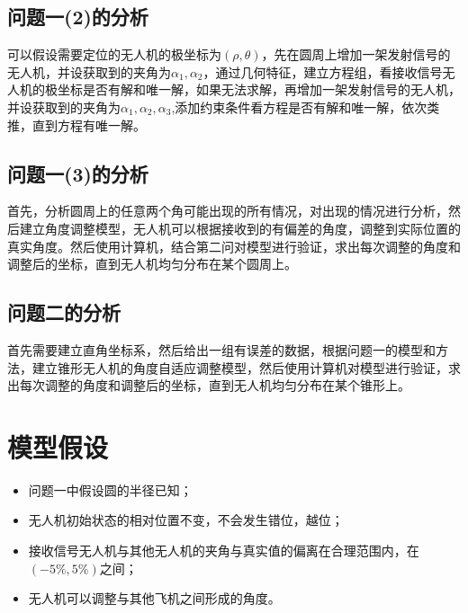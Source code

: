 \documentclass[withoutpreface,bwprint]{cumcmthesis} %
\begin{document}
		\subsection{问题一(2)的分析}
		可以假设需要定位的无人机的极坐标为\textbf{$(\rho,\theta)$}，先在圆周上增加一架发射信号的无人机，并设获取到的夹角为\textbf{$\alpha_1,\alpha_2$}，通过几何特征，建立方程组，看接收信号无人机的极坐标是否有解和唯一解，如果无法求解，再增加一架发射信号的无人机，并设获取到的夹角为\textbf{$\alpha_1,\alpha_2,\alpha_3$},添加约束条件看方程是否有解和唯一解，依次类推，直到方程有唯一解。
		
		\subsection{问题一(3)的分析}
		首先，分析圆周上的任意两个角可能出现的所有情况，对出现的情况进行分析，然后建立角度调整模型，无人机可以根据接收到的有偏差的角度，调整到实际位置的真实角度。然后使用计算机，结合第二问对模型进行验证，求出每次调整的角度和调整后的坐标，直到无人机均匀分布在某个圆周上。
		
		\subsection{问题二的分析}
		首先需要建立直角坐标系，然后给出一组有误差的数据，根据问题一的模型和方法，建立锥形无人机的角度自适应调整模型，然后使用计算机对模型进行验证，求出每次调整的角度和调整后的坐标，直到无人机均匀分布在某个锥形上。
	
	\section{模型假设}
		\begin{itemize}
		\item 问题一中假设圆的半径已知；
		\item 无人机初始状态的相对位置不变，不会发生错位，越位；
		\item 接收信号无人机与其他无人机的夹角与真实值的偏离在合理范围内，在$(-5\%,5\%)$之间；
		\item 无人机可以调整与其他飞机之间形成的角度。
	\end{itemize}
	
\end{document}
